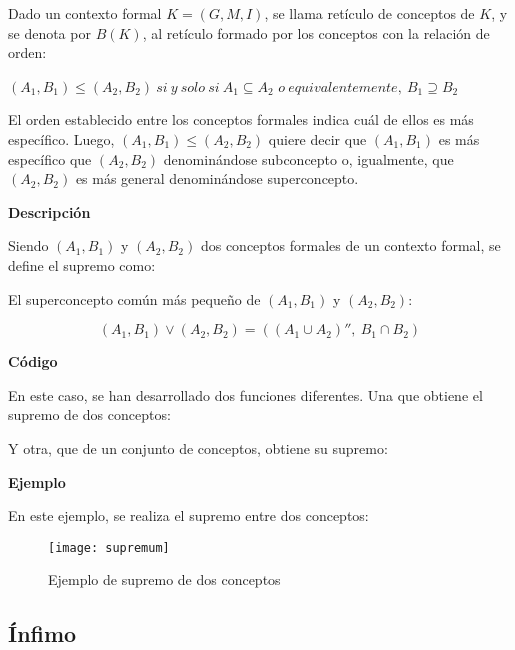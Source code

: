         Dado un contexto formal \( K = (G, M, I) \), se llama ret\'iculo de conceptos de \(K\), y se denota por \( B (K) \), al ret\'iculo 
        formado por los conceptos con la relaci\'on de orden:

        \( (A_{1}, B_{1}) \leq (A_{2}, B_{2}) ~ si ~ y ~ solo ~ si ~ A_{1} \subseteq A_{2} \)
        \( o ~ equivalentemente, ~ B_{1} \supseteq B_{2} \)

        \bigskip


        El orden establecido entre los conceptos formales indica cu\'al de ellos es m\'as espec\'ifico. Luego,  \( (A_{1}, B_{1}) \leq (A_{2}, B_{2})\) 
        quiere decir que  \( (A_{1}, B_{1}) \) es m\'as espec\'ifico que \( (A_{2}, B_{2}) \) denomin\'andose subconcepto o, igualmente, que  
        \( (A_{2}, B_{2}) \) es m\'as general denomin\'andose superconcepto.

        \bigskip


        \textbf{Descripci\'on}

        Siendo \((A_{1}, B_{1}) \) y \((A_{2}, B_{2})\) dos conceptos formales de un contexto formal, se define el supremo como:

        El superconcepto com\'un m\'as peque\~no de \((A_{1}, B_{1}) \) y \((A_{2}, B_{2})\):

        \[ (A_{1}, B_{1}) \vee (A_{2}, B_{2}) = ((A_{1} \cup A_{2})'', ~ B_{1}\cap B_{2}) \]

        \bigskip
        \textbf{C\'odigo}

        En este caso, se han desarrollado dos funciones diferentes. Una que obtiene el supremo de dos conceptos:

        

        Y otra, que de un conjunto de conceptos, obtiene su supremo:

        

        \clearpage

        \textbf{Ejemplo}

        En este ejemplo, se realiza el supremo entre dos conceptos:

        \begin{figure}[H]
            \centering
            \texttt{[image: supremum]}
            \caption{Ejemplo de supremo de dos conceptos}
            \label{fig:supremum}
        \end{figure}


    \subsection{\'Infimo}

